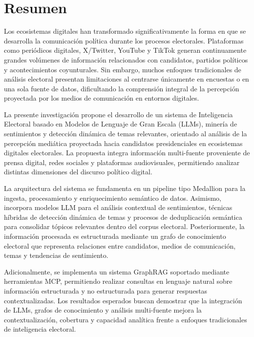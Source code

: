 
\chapter*{Resumen}
{}

Los ecosistemas digitales han transformado significativamente la forma en que se desarrolla la comunicación política durante los procesos electorales. Plataformas como periódicos digitales, X/Twitter, YouTube y TikTok generan continuamente grandes volúmenes de información relacionados con candidatos, partidos políticos y acontecimientos coyunturales. Sin embargo, muchos enfoques tradicionales de análisis electoral presentan limitaciones al centrarse únicamente en encuestas o en una sola fuente de datos, dificultando la comprensión integral de la percepción proyectada por los medios de comunicación en entornos digitales.

La presente investigación propone el desarrollo de un sistema de Inteligencia Electoral basado en Modelos de Lenguaje de Gran Escala (LLMs), minería de sentimientos y detección dinámica de temas relevantes, orientado al análisis de la percepción mediática proyectada hacia candidatos presidenciales en ecosistemas digitales electorales. La propuesta integra información multi-fuente proveniente de prensa digital, redes sociales y plataformas audiovisuales, permitiendo analizar distintas dimensiones del discurso político digital.

La arquitectura del sistema se fundamenta en un pipeline tipo Medallion para la ingesta, procesamiento y enriquecimiento semántico de datos. Asimismo, incorpora modelos LLM para el análisis contextual de sentimientos, técnicas híbridas de detección dinámica de temas y procesos de deduplicación semántica para consolidar tópicos relevantes dentro del corpus electoral. Posteriormente, la información procesada es estructurada mediante un grafo de conocimiento electoral que representa relaciones entre candidatos, medios de comunicación, temas y tendencias de sentimiento.

Adicionalmente, se implementa un sistema GraphRAG soportado mediante herramientas MCP, permitiendo realizar consultas en lenguaje natural sobre información estructurada y no estructurada para generar respuestas contextualizadas. Los resultados esperados buscan demostrar que la integración de LLMs, grafos de conocimiento y análisis multi-fuente mejora la contextualización, cobertura y capacidad analítica frente a enfoques tradicionales de inteligencia electoral.

